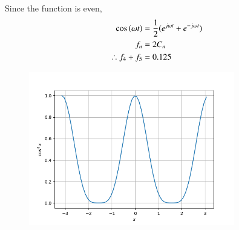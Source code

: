 \documentclass[journal,12pt,onecolumn]{IEEEtran}
\theoremstyle{remark}
\begin{document}
Since the function is even, 
\begin{align}
\cos\left(\omega t\right) &= \frac{1}{2}(e^{j\omega t}+e^{-j\omega t}) \\
f_n &= 2C_n \\
\therefore f_4 + f_5 &= 0.125
\end{align}
\begin{figure}[ht]
	\centering
	\includegraphics[width=0.8\textwidth]{./figs/fig1.png}
\end{figure}
\end{document}

